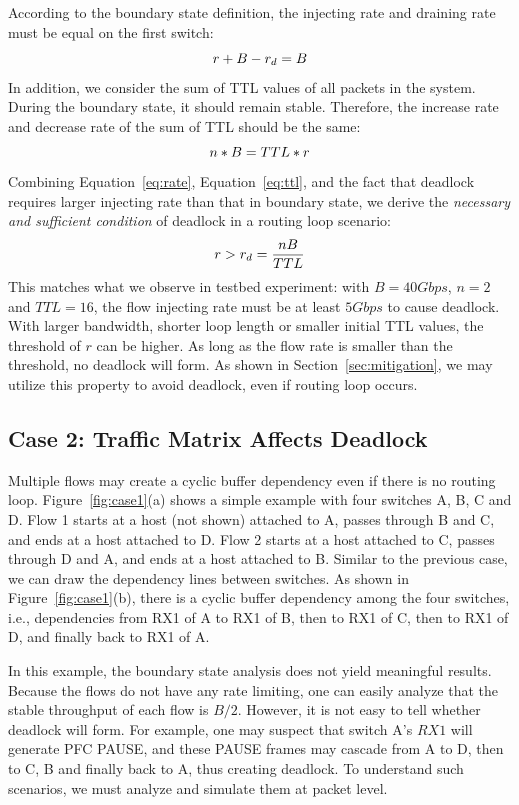According to the boundary state definition, the injecting rate and draining rate
must be equal on the first switch:
\begin{equation}
\small
r + B - r_d = B
\label{eq:rate}
\end{equation}
In addition, we consider the sum of TTL values of all packets in the system.
During the boundary state, it should remain stable. Therefore, the increase
rate and decrease rate of the sum of TTL should be the same:
\begin{equation}
\small
n * B = TTL * r
\label{eq:ttl}
\end{equation}
Combining Equation~\ref{eq:rate}, Equation~\ref{eq:ttl}, and the fact that
deadlock requires larger injecting rate than that in boundary state, we derive the
{\em necessary and sufficient condition} of deadlock in a routing loop scenario:
\begin{equation}
\small
r > r_d = \frac{nB}{TTL}
\label{eq:condition}
\end{equation}
This matches what we observe in testbed experiment: with $B=40Gbps$, $n=2$ and
$TTL=16$, the flow injecting rate must be at least $5Gbps$ to cause deadlock. With larger bandwidth,
shorter loop length or smaller initial TTL values, the threshold of $r$ can be higher.
As long as the flow rate is smaller than the threshold, no deadlock will form.
As shown in Section~\ref{sec:mitigation}, we may utilize this property to avoid deadlock,
even if routing loop occurs.

\secspace
\subsection{Case 2: Traffic Matrix Affects Deadlock}
\secspace

Multiple flows may create a cyclic buffer dependency even if there is no routing loop.
Figure~\ref{fig:case1}(a) shows a simple example with four switches A, B, C and D.
Flow 1 starts at a host (not shown) attached to A, passes through B and C, and ends at a
host attached to D. Flow 2 starts at a host attached to C, passes through D and A, and
ends at a host attached to B.
Similar to the previous case, we can draw the dependency lines between switches. As shown in
Figure~\ref{fig:case1}(b), there is a cyclic buffer dependency among the four switches, i.e.,
dependencies from RX1 of A to RX1 of B, then to RX1 of C, then to RX1 of D, and finally back to RX1 of A.


In this example, the boundary state analysis does not yield meaningful
results. Because the flows do not have any rate limiting, one can easily analyze that the
stable throughput of each flow is $B/2$. However, it is not easy to tell whether deadlock
will form. For example, one may suspect that switch A's $RX1$ will generate PFC PAUSE, and
these PAUSE frames may cascade from A to D, then to C, B and finally back to A, thus creating deadlock.
To understand such scenarios, we must analyze and simulate them at packet level.


